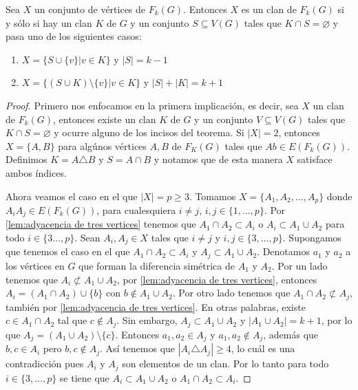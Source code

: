     \begin{teorema}
        \label{teo:relacion clan en G y F(G)}
        Sea $X$ un conjunto de v\'ertices de $F_k(G)$. Entonces $X$ es un clan
        de $F_k(G)$ si y s\'olo si hay un clan $K$ de $G$ y un conjunto $S
        \subseteq V(G)$ tales que $K \cap S = \varnothing$ y pasa uno de los
        siguientes casos:
        \begin{enumerate}
            \item $X = \{S \cup \{v\}| v \in K\}$ y $|S| = k-1$
            \item $X = \{(S\cup K) \setminus \{v\}| v \in K \}$ y $|S| + |K| =
            k+1$
        \end{enumerate}
    \end{teorema}

    \begin{proof}
        Primero nos enfocamos en la primera implicaci\'on, es decir, sea $X$ un
        clan de $F_k(G)$, entonces existe un clan $K$ de $G$ y un conjunto $V
        \subseteq V(G)$ tales que $K \cap S = \varnothing$ y ocurre alguno de
        los incisos del teorema. Si $|X|=2$, entonces $X= \{A, B\}$ para
        alg\'unos v\'ertices $A, B$ de $F_K(G)$ tales que $Ab \in E(F_k(G))$.
        Definimos $K = A \triangle B$ y $S=A \cap B$ y notamos que de esta
        manera $X$ satisface ambos \'indices.

        Ahora veamos el caso en el que $|X|= p \geq 3$. Tomamos $X=\{A_1, A_2,
        \dots, A_p\}$ donde $A_iA_j \in E(F_k(G))$, para cualesquiera $i\neq j$,
        $i,j \in \{1, \dots, p\}$. Por \cref{lem:adyacencia de tres vertices}
        tenemos que $A_1\cap A_2 \subset A_i$ o $A_i \subset A_1 \cup A_2$ para
        todo $i \in \{3 \dots,p \}$. Sean $A_i, A_j \in X$ tales que $i \neq j$
        y $i, j \in \{3, \dots, p\}$. Supongamos que tenemos el caso en el que
        $A_1\cap A_2 \subset A_i$ y $A_j \subset A_1 \cup A_2$. Denotamos $a_1$
        y $a_2$ a los v\'ertices en $G$ que forman la diferencia sim\'etrica de
        $A_1$ y $A_2$. Por un lado tenemos que $A_i \not\subset A_1\cup A_2$,
        por \cref{lem:adyacencia de tres vertices}, entonces $A_i = (A_1\cap
        A_2) \cup \{b\}$ con $b \notin A_1\cup A_2$. Por otro lado tenemos que
        $A_1 \cap A_2 \not\subset A_j$, tambi\'en por \cref{lem:adyacencia de
        tres vertices}. En otras palabras, existe $c \in A_1 \cap A_2$ tal que
        $c \notin A_j$. Sin embargo, $A_j \subset A_1 \cup A_2$ y $|A_1 \cup
        A_2| =k+1$, por lo que $A_j = (A_1 \cup A_2)\setminus \{c\}$. Entonces
        $a_1, a_2 \in A_j$ y $a_1, a_2 \notin A_j$, adem\'as que $b, c \in A_i$
        pero $b, c \notin A_j$. As\'i tenemos que $|A_i \triangle A_j| \geq 4$,
        lo cu\'al es una contradicci\'on pues $A_i$ y $A_j$ son elementos de un
        clan. Por lo tanto para todo $i\in \{3, \dots, p\}$ se tiene que $A_i
        \subset A_1\cup A_2$ o $A_1 \cap A_2 \subset A_i$.


\end{proof}
